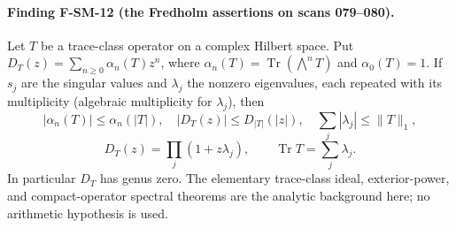 \documentclass[11pt,a4paper]{article}
\theoremstyle{definition}\newtheorem{definition}[theorem]{Definition}
\theoremstyle{remark}\newtheorem{remark}[theorem]{Remark}
\begin{document}
\paragraph{Finding F-SM-12 (the Fredholm assertions on scans 079--080).}
Let $T$ be a trace-class operator on a complex Hilbert space.  Put
$D_T(z)=\sum_{n\geq0}\alpha_n(T)z^n$, where
$\alpha_n(T)=\operatorname{Tr}(\bigwedge^nT)$ and $\alpha_0(T)=1$.
If $s_j$ are the singular values and $\lambda_j$ the nonzero eigenvalues,
each repeated with its multiplicity (algebraic multiplicity for
$\lambda_j$), then
\[
 |\alpha_n(T)|\leq\alpha_n(|T|),\quad
 |D_T(z)|\leq D_{|T|}(|z|),\quad
 \sum_j|\lambda_j|\leq\|T\|_1,
\]
\[
 D_T(z)=\prod_j(1+z\lambda_j),\qquad
 \operatorname{Tr}T=\sum_j\lambda_j.
\]
In particular $D_T$ has genus zero.  The elementary trace-class ideal,
exterior-power, and compact-operator spectral theorems are the analytic
background here; no arithmetic hypothesis is used.
\end{document}
